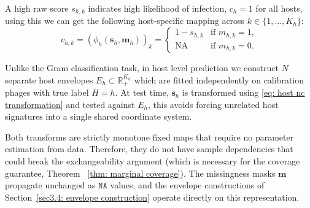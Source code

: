 A high raw score $s_{h,k}$ indicates high likelihood of infection, $c_h = 1$ for all hosts, using this we can get the 
following host-specific mapping across $k \in \{1, \ldots, K_h\}$:
\begin{equation}
\label{eq: host nc transformation}
v_{h,k} = (\phi_h(\mathbf{s}_h, \mathbf{m}_h))_k = \begin{cases} 
1 - s_{h,k} & \text{if } m_{h,k} = 1, \\
\text{NA} & \text{if } m_{h,k} = 0.
\end{cases}
\end{equation}

Unlike the Gram classification task, in host level prediction we construct $N$ separate host envelopes $E_h \subset 
\mathbb{R}_+^{K_h}$ which are fitted independently on calibration phages with true label $H = h$. At test time, $\mathbf{s}_h$ 
is transformed using \eqref{eq: host nc transformation} and tested against $E_h$, this avoids forcing unrelated host signatures 
into a single shared coordinate system.

Both transforms are strictly monotone fixed maps that require no parameter estimation from data. Therefore, they do 
not have sample dependencies that could break the exchangeability argument (which is necessary for the coverage guarantee, Theorem
~\ref{thm: marginal coverage}). The missingness masks $\mathbf{m}$ propagate unchanged as $\texttt{NA}$ values, and the 
envelope constructions of Section~\ref{sec3.4: envelope construction} operate directly on this representation.

